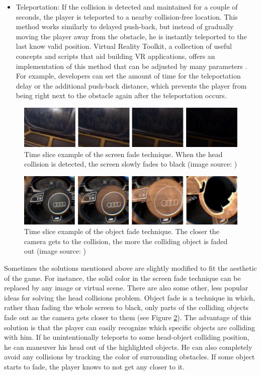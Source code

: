 \begin{itemize}
\item Teleportation: If the collision is detected and maintained for a couple of seconds, the player is teleported to a nearby collision-free location. This method works similarly to delayed push-back, but instead of gradually moving the player away from the obstacle, he is instantly teleported to the last know valid position. Virtual Reality Toolkit, a collection of useful concepts and scripts that aid building VR applications, offers an implementation of this method that can be adjusted by many parameters \cite{VRTK_REWIND}. For example, developers can set the amount of time for the teleportation delay or the additional push-back distance, which prevents the player from being right next to the obstacle again after the teleportation occurs. 
\end{itemize}

\begin{figure}[th]
\centering
\includegraphics[width=1\textwidth]{img/screen_fade.png}
\caption{Time slice example of the screen fade technique. When the head collision is detected, the screen slowly fades to black (image source: \cite{SCREENFADE})}
\label{fig:SCREENFADEIMAGE}
\end{figure}

\begin{figure}[th]
\centering
\includegraphics[width=1\textwidth]{img/object_fade.png}
\caption{Time slice example of the object fade technique. The closer the camera gets to the collision, the more the colliding object is faded out (image source: \cite{OBJECTFADE})}
\label{fig:OBJECTFADEIMAGE}
\end{figure}

Sometimes the solutions mentioned above are slightly modified to fit the aesthetic of the game. For instance, the solid color in the screen fade technique can be replaced by any image or virtual scene. There are also some other, less popular ideas for solving the head collisions problem. Object fade is a technique in which, rather than fading the whole screen to black, only parts of the colliding objects fade out as the camera gets closer to them (see Figure \ref{fig:OBJECTFADEIMAGE}). The advantage of this solution is that the player can easily recognize which specific objects are colliding with him. If he unintentionally teleports to some head-object colliding position, he can maneuver his head out of the highlighted objects. He can also completely avoid any collisions by tracking the color of surrounding obstacles. If some object starts to fade, the player knows to not get any closer to it. 

